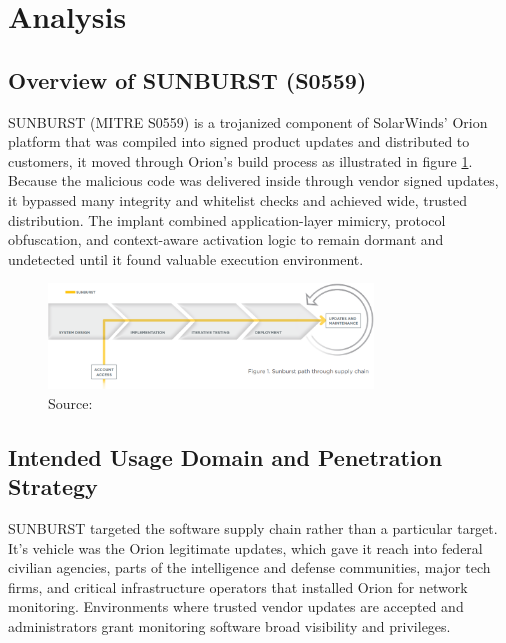 \documentclass[conference]{IEEEtran}
\begin{document}
\section{Analysis}
\subsection{Overview of SUNBURST (S0559)}
SUNBURST (MITRE S0559)\cite{MITRE2025SunburstS0559} is a trojanized component of SolarWinds' Orion platform that was compiled into
signed product updates and distributed to customers, it moved through Orion's build process as illustrated in figure \ref{fig:SUNBURSTPath}. Because 
the malicious code was delivered inside through vendor signed updates, it bypassed many integrity and whitelist checks
and achieved wide, trusted distribution. The implant combined application-layer mimicry, protocol obfuscation, and context-aware activation logic to 
remain dormant and undetected
until it found valuable execution environment.
\begin{figure}[H]
    \centering
    \includegraphics[width=3.4in]{SUNBURST-path.png}
    \caption{Source: \cite{BrokenTrustHerrEtAl} }
    \label{fig:SUNBURSTPath}
\end{figure}

\subsection{Intended Usage Domain and Penetration Strategy}
SUNBURST targeted the software supply chain rather than a particular target. It's vehicle was the Orion legitimate updates, which gave it reach into federal civilian agencies,
parts of the intelligence and defense communities, major tech firms, and critical infrastructure operators that installed Orion for network monitoring. Environments where trusted
vendor updates are accepted and administrators grant monitoring software broad visibility and privileges.
\end{document}
